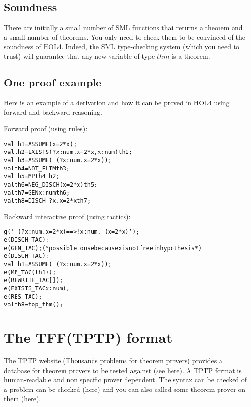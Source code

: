 \documentclass[a4paper, 11pt]{article}
\theoremstyle{plain}
\theoremstyle{definition}
\theoremstyle{remark}
\begin{document}
\subsection{Soundness}
  There are initially a small number of SML functions that returns a theorem and a small number of theorems. You only need to check them to be convinced of the soundness of HOL4. Indeed, the SML type-checking system (which you need to trust) will guarantee that any new variable of type $thm$ is a theorem.

\subsection{One proof example}
Here is an example of a derivation and how it can be proved in HOL4 using forward and backward reasoning.

\begin{prooftree}
\end{prooftree}
Forward proof (using rules):
\begin{alltt}
val th1=ASSUME (x=2*x);
val th2=EXISTS (?x:num.x=2*x,x:num) th1;
val th3=ASSUME (~(?x:num. x=2*x));
val th4=NOT_ELIM th3;
val th5=MP th4 th2;
val th6=NEG_DISCH (x=2*x) th5;
val th7=GEN x:num th6;
val th8=DISCH ~?x. x = 2 * x th7;
\end{alltt}
Backward interactive proof (using tactics): 
\begin{alltt}
g(`~(?x:num. x=2*x) ==> !x:num. ~(x=2*x)`);
e(DISCH_TAC);
e(GEN_TAC);(*possible to use because x is not free in hypothesis*)
e(DISCH_TAC);
val th1=ASSUME(~(?x:num. x=2*x));
e(MP_TAC(th1));
e(REWRITE_TAC []);
e(EXISTS_TAC x:num);
e(RES_TAC);
val th8=top_thm();
\end{alltt}


\section{The TFF(TPTP) format}
    The TPTP website (Thousands problems for theorem provers) provides a database for theorem provers to be tested against (see here). A TPTP format is human-readable and non specific prover dependent. The syntax can be checked of a problem can be checked (here) and you can also called some theorem prover on them (here).
\end{document}
